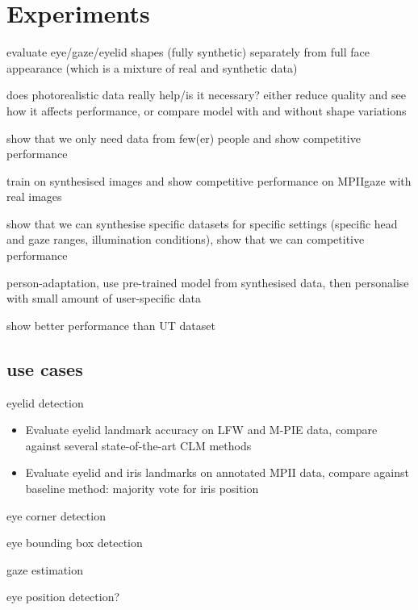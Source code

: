 
\section{Experiments}

evaluate eye/gaze/eyelid shapes (fully synthetic) separately from full face appearance (which is a mixture of real and synthetic data)

does photorealistic data really help/is it necessary? either reduce quality and see how it affects performance, or compare model with and without shape variations

show that we only need data from few(er) people and show competitive performance

train on synthesised images and show competitive performance on MPIIgaze with real images

show that we can synthesise specific datasets for specific settings (specific head and gaze ranges, illumination conditions), show that we can competitive performance

person-adaptation, use pre-trained model from synthesised data, then personalise with small amount of user-specific data

show better performance than UT dataset


\subsection{use cases}

eyelid detection

\begin{itemize}
    \item Evaluate eyelid landmark accuracy on LFW and M-PIE data, compare against several state-of-the-art CLM methods
    \item Evaluate eyelid and iris landmarks on annotated MPII data, compare against baseline method: majority vote for iris position
\end{itemize}

eye corner detection

eye bounding box detection

gaze estimation

eye position detection?
